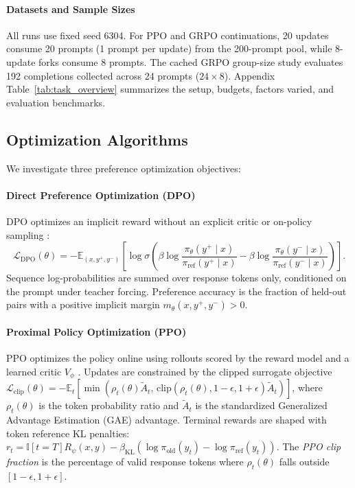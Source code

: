 \documentclass{article}
\begin{document}
\paragraph{Datasets and Sample Sizes} All runs use fixed seed 6304. For PPO and GRPO continuations, 20 updates consume 20 prompts (1 prompt per update) from the 200-prompt pool, while 8-update forks consume 8 prompts. The cached GRPO group-size study evaluates 192 completions collected across 24 prompts ($24 \times 8$). Appendix Table~\ref{tab:task_overview} summarizes the setup, budgets, factors varied, and evaluation benchmarks.

\subsection{Optimization Algorithms}
\label{sec:setup_algorithms}

We investigate three preference optimization objectives:

\paragraph{Direct Preference Optimization (DPO)} DPO optimizes an implicit reward without an explicit critic or on-policy sampling \citep{rafailov2023dpo, gunton2024understanding}:
\[
\mathcal{L}_{\text{DPO}}(\theta) = -\mathbb{E}_{(x, y^+, y^-)} \left[ \log \sigma \left( \beta \log \frac{\pi_\theta(y^+ \mid x)}{\pi_{\text{ref}}(y^+ \mid x)} - \beta \log \frac{\pi_\theta(y^- \mid x)}{\pi_{\text{ref}}(y^- \mid x)} \right) \right].
\]
Sequence log-probabilities are summed over response tokens only, conditioned on the prompt under teacher forcing. Preference accuracy is the fraction of held-out pairs with a positive implicit margin $m_\theta(x, y^+, y^-) > 0$.

\paragraph{Proximal Policy Optimization (PPO)} PPO optimizes the policy online using rollouts scored by the reward model and a learned critic $V_\phi$ \citep{schulman2017ppo, ouyang2022instructgpt, wolfe2023ppo, huang2023ndetails, vonwerra2020trl}. Updates are constrained by the clipped surrogate objective $\mathcal{L}_{\text{clip}}(\theta) = -\mathbb{E}_t [ \min(\rho_t(\theta) \tilde{A}_t, \, \text{clip}(\rho_t(\theta), 1-\epsilon, 1+\epsilon) \tilde{A}_t) ]$, where $\rho_t(\theta)$ is the token probability ratio and $\tilde{A}_t$ is the standardized Generalized Advantage Estimation (GAE) advantage. Terminal rewards are shaped with token reference KL penalties: $r_t = \mathbb{I}[t = T] R_\psi(x, y) - \beta_{\text{KL}}(\log \pi_{\text{old}}(y_t) - \log \pi_{\text{ref}}(y_t))$. The \textit{PPO clip fraction} is the percentage of valid response tokens where $\rho_t(\theta)$ falls outside $[1-\epsilon, 1+\epsilon]$.
\end{document}
